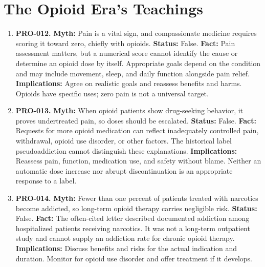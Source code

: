 \documentclass[11pt,oneside]{book}
\begin{document}
\section{The Opioid Era's Teachings}
\begin{enumerate}[leftmargin=0pt,labelwidth=0pt,labelsep=0pt,itemindent=0pt]
\item[] \textbf{PRO-012.} \textbf{Myth:} Pain is a vital sign, and compassionate medicine requires scoring it toward zero, chiefly with opioids.\newline
\textbf{Status:} False.\newline
\textbf{Fact:} Pain assessment matters, but a numerical score cannot identify the cause or determine an opioid dose by itself. Appropriate goals depend on the condition and may include movement, sleep, and daily function alongside pain relief. \cite{ref492}\newline
\textbf{Implications:} Agree on realistic goals and reassess benefits and harms. Opioids have specific uses; zero pain is not a universal target.
\item[] \textbf{PRO-013.} \textbf{Myth:} When opioid patients show drug-seeking behavior, it proves undertreated pain, so doses should be escalated.\newline
\textbf{Status:} False.\newline
\textbf{Fact:} Requests for more opioid medication can reflect inadequately controlled pain, withdrawal, opioid use disorder, or other factors. The historical label pseudoaddiction cannot distinguish these explanations. \cite{ref163,ref492}\newline
\textbf{Implications:} Reassess pain, function, medication use, and safety without blame. Neither an automatic dose increase nor abrupt discontinuation is an appropriate response to a label.
\item[] \textbf{PRO-014.} \textbf{Myth:} Fewer than one percent of patients treated with narcotics become addicted, so long-term opioid therapy carries negligible risk.\newline
\textbf{Status:} False.\newline
\textbf{Fact:} The often-cited letter described documented addiction among hospitalized patients receiving narcotics. It was not a long-term outpatient study and cannot supply an addiction rate for chronic opioid therapy. \cite{ref164,ref492}\newline
\textbf{Implications:} Discuss benefits and risks for the actual indication and duration. Monitor for opioid use disorder and offer treatment if it develops.
\end{enumerate}
\end{document}
